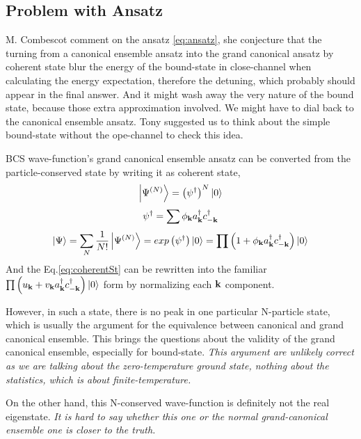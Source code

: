 \subsection{Problem with Ansatz}
M. Combescot comment on the ansatz \eqref{eq:ansatz}, she conjecture that the turning from a canonical ensemble ansatz into the grand canonical ansatz by coherent state blur the energy of the bound-state in close-channel when calculating the energy expectation, therefore the detuning, which probably should appear in the final answer.  And it might wash away the very nature of the bound state, because those extra approximation involved.  We might have to dial back to the canonical ensemble ansatz.  Tony suggested us to think about the simple bound-state without the ope-channel to check this idea.  

BCS wave-function's grand canonical ensemble ansatz can be converted from the particle-conserved state by writing it as coherent state, 
\begin{equation}
\left|\Psi^{(N)}\right>=\left(\psi^{\dagger}\right)^N\left|0\right>
\end{equation} 
\begin{equation}
 \psi^{\dagger}=\sum\phi_{\mathbf{k}}{a^{\dagger}_{\mathbf{k}}{}c^{\dagger}_{-\mathbf{k}}}
\end{equation}
\begin{equation}\label{eq:coherentSt}
\left|\Psi\right>=\sum_N\frac{1}{N!}\left|\Psi^{(N)}\right>=exp\left(\psi^{\dagger}\right)\left|0\right>=\prod\left(1+\phi_{\mathbf{k}}{a^{\dagger}_{\mathbf{k}}{}c^{\dagger}_{-\mathbf{k}}}\right)\left|0\right>
\end{equation}
And the Eq.\eqref{eq:coherentSt} can be rewritten into the familiar $\prod\left(u_{\mathbf{k}}+v_{\mathbf{k}}{a^{\dagger}_{\mathbf{k}}{}c^{\dagger}_{-\mathbf{k}}}\right)\left|0\right>$ form by normalizing each $\mathbf{k}$ component. 

However, in such a state, there is no peak in one particular N-particle state, which is usually the argument for the equivalence between canonical and grand canonical ensemble.  This brings the questions about the validity of the grand canonical ensemble, especially for bound-state.  \emph{This argument are unlikely correct as we are talking about the zero-temperature ground state, nothing about the statistics, which is about finite-temperature.  }   

On the other hand, this N-conserved wave-function is definitely not the real eigenstate.  \emph{It is hard to say whether this one or the normal grand-canonical ensemble one is closer to the truth.}

